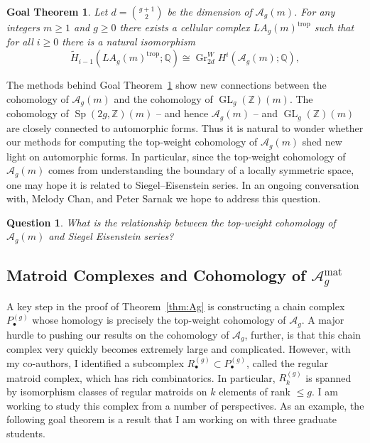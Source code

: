 \documentclass[11pt,reqno]{amsart}
\newtheorem{goalTheorem}[lemma]{Goal Theorem}
\newtheorem{question}[lemma]{Question}
\theoremstyle{remark}
\newcommand{\Gr}{\operatorname{Gr}}
\newcommand{\GL}{{\operatorname{GL}}}
\newcommand{\Sp}{\operatorname{Sp}}
\newcommand{\trop}{\operatorname{trop}}
\newcommand{\cA}{\mathcal{A}}
\newcommand{\Q}{\mathbb{Q}}
\newcommand{\Z}{\mathbb{Z}}
\begin{document}
\begin{goalTheorem}\label{goalThm:agm}
Let $d=\binom{g+1}{2}$ be the dimension of $\cA_{g}(m)$. For any integers $m\geq1$ and $g\geq0$ there exists a cellular complex $LA_{g}(m)^{\trop}$ such that for all $i\geq0$ there is a natural isomorphism
\[
\tilde{H}_{i-1}\left(LA_{g}(m)^{\trop};\Q\right) \cong \Gr_{2d}^W\!H^{i}\left(\cA_{g}(m);\mathbb{Q}\right),
\]
\end{goalTheorem}

The methods behind  Goal Theorem~\ref{goalThm:agm} show new connections between the cohomology of $\cA_{g}(m)$ and the cohomology of $\GL_{g}(\Z)(m)$. The cohomology of $\Sp(2g,\Z)(m)$ -- and hence  $\cA_{g}(m)$ -- and $\GL_{g}(\Z)(m)$ are closely connected to automorphic forms. Thus it is natural to wonder whether our methods for computing the top-weight cohomology of $\cA_{g}(m)$ shed new light on automorphic forms. In particular, since the top-weight cohomology of $\cA_{g}(m)$ comes from understanding the boundary of a locally symmetric space, one may hope it is related to Siegel--Eisenstein series. In an ongoing conversation with, Melody Chan, and Peter Sarnak we hope to address this question.

\begin{question}
What is the relationship between the top-weight cohomology of $\cA_{g}(m)$ and Siegel Eisenstein series?
\end{question}

\subsection{Matroid Complexes and Cohomology of $\cA_{g}^{\text{mat}}$}

A key step in the proof of Theorem~\ref{thm:Ag} is constructing a chain complex $P^{(g)}_{\bullet}$ whose homology is precisely the top-weight cohomology of $\cA_{g}$. A major hurdle to pushing our results on the cohomology of $\cA_{g}$, further, is that this chain complex very quickly becomes extremely large and complicated. However,  with my co-authors, I identified a subcomplex $R^{(g)}_{\bullet} \subset P^{(g)}_{\bullet}$, called the regular matroid complex, which has rich combinatorics. In particular, $R^{(g)}_{k}$ is spanned by isomorphism classes of regular matroids on $k$ elements of rank $\leq g$.  I am working to study this complex from a number of perspectives. As an example, the following goal theorem is a result that I am working on with three graduate students.
\end{document}
